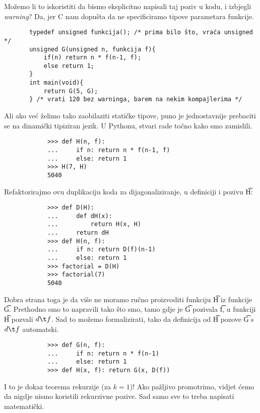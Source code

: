 Možemo li to iskoristiti da bismo eksplicitno napisali taj poziv u kodu, i izbjegli \emph{warning}? Da, jer C nam dopušta da ne specificiramo tipove parametara funkcije.

\begin{verbatim}
       typedef unsigned funkcija(); /* prima bilo što, vraća unsigned */
       unsigned G(unsigned n, funkcija f){
           if(n) return n * f(n-1, f);
           else return 1;
       }
       int main(void){
           return G(5, G);
       } /* vrati 120 bez warninga, barem na nekim kompajlerima */
\end{verbatim}

Ali ako već želimo tako zaobilaziti statičke tipove, puno je jednostavnije prebaciti se na dinamički tipiziran jezik. U Pythonu, stvari rade točno kako smo zamislili.

\begin{verbatim}
            >>> def H(n, f):
            ...     if n: return n * f(n-1, f)
            ...     else: return 1
            >>> H(7, H)
            5040
\end{verbatim}

Refaktorirajmo ovu duplikaciju koda za dijagonaliziranje, u definiciji i pozivu \t H:

\begin{verbatim}
            >>> def D(H):
            ...     def dH(x):
            ...         return H(x, H)
            ...     return dH
            >>> def H(n, f):
            ...     if n: return D(f)(n-1)
            ...     else: return 1
            >>> factorial = D(H)
            >>> factorial(7)
            5040
\end{verbatim}
Dobra strana toga je da više ne moramo ručno proizvoditi funkciju \t H iz funkcije \t G. Prethodno smo to napravili tako što smo, tamo gdje je \t G pozivala \t f, u funkciji \t H pozvali $d\t f$. Sad to možemo formalizirati, tako da definicija od \t H pozove \t G s $d\t f$ automatski.
\begin{verbatim}
            >>> def G(n, f):
            ...     if n: return n * f(n-1)
            ...     else: return 1
            >>> def H(x, f): return G(x, D(f))
\end{verbatim}

I to je dokaz teorema rekurzije (za $k=1$)! Ako pažljivo promotrimo, vidjet ćemo da nigdje nismo koristili rekurzivne pozive. Sad samo sve to treba napisati matematički.

